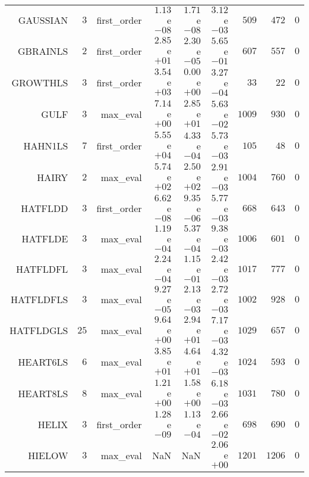 \begin{longtable}{rrrrrrrrr}
GAUSSIAN & \(     3\) & first\_order & \( 1.13\)e\(-08\) & \( 1.71\)e\(-08\) & \( 3.12\)e\(-03\) & \(   509\) & \(   472\) & \(     0\) \\
GBRAINLS & \(     2\) & first\_order & \( 2.85\)e\(+01\) & \( 2.30\)e\(-05\) & \( 5.65\)e\(-01\) & \(   607\) & \(   557\) & \(     0\) \\
GROWTHLS & \(     3\) & first\_order & \( 3.54\)e\(+03\) & \( 0.00\)e\(+00\) & \( 3.27\)e\(-04\) & \(    33\) & \(    22\) & \(     0\) \\
GULF & \(     3\) & max\_eval & \( 7.14\)e\(+00\) & \( 2.85\)e\(+01\) & \( 5.63\)e\(-02\) & \(  1009\) & \(   930\) & \(     0\) \\
HAHN1LS & \(     7\) & first\_order & \( 5.55\)e\(+04\) & \( 4.33\)e\(-04\) & \( 5.73\)e\(-03\) & \(   105\) & \(    48\) & \(     0\) \\
HAIRY & \(     2\) & max\_eval & \( 5.74\)e\(+02\) & \( 2.50\)e\(+02\) & \( 2.91\)e\(-03\) & \(  1004\) & \(   760\) & \(     0\) \\
HATFLDD & \(     3\) & first\_order & \( 6.62\)e\(-08\) & \( 9.35\)e\(-06\) & \( 5.77\)e\(-03\) & \(   668\) & \(   643\) & \(     0\) \\
HATFLDE & \(     3\) & max\_eval & \( 1.19\)e\(-04\) & \( 5.37\)e\(-04\) & \( 9.38\)e\(-03\) & \(  1006\) & \(   601\) & \(     0\) \\
HATFLDFL & \(     3\) & max\_eval & \( 2.24\)e\(-04\) & \( 1.15\)e\(-01\) & \( 2.42\)e\(-03\) & \(  1017\) & \(   777\) & \(     0\) \\
HATFLDFLS & \(     3\) & max\_eval & \( 9.27\)e\(-05\) & \( 2.13\)e\(-03\) & \( 2.72\)e\(-03\) & \(  1002\) & \(   928\) & \(     0\) \\
HATFLDGLS & \(    25\) & max\_eval & \( 9.64\)e\(+00\) & \( 2.94\)e\(+01\) & \( 7.17\)e\(-03\) & \(  1029\) & \(   657\) & \(     0\) \\
HEART6LS & \(     6\) & max\_eval & \( 3.85\)e\(+01\) & \( 4.64\)e\(+01\) & \( 4.32\)e\(-03\) & \(  1024\) & \(   593\) & \(     0\) \\
HEART8LS & \(     8\) & max\_eval & \( 1.21\)e\(+00\) & \( 1.58\)e\(+00\) & \( 6.18\)e\(-03\) & \(  1031\) & \(   780\) & \(     0\) \\
HELIX & \(     3\) & first\_order & \( 1.28\)e\(-09\) & \( 1.13\)e\(-04\) & \( 2.66\)e\(-02\) & \(   698\) & \(   690\) & \(     0\) \\
HIELOW & \(     3\) & max\_eval &       NaN &       NaN & \( 2.06\)e\(+00\) & \(  1201\) & \(  1206\) & \(     0\) \\

\end{longtable}
